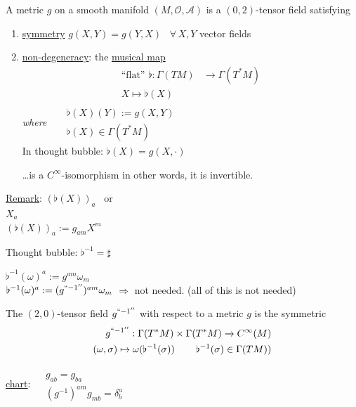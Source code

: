 	\begin{definition}
		A metric $g$ on a smooth manifold $(M,\mathcal{O}, \mathcal{A})$ is a $(0,2)$-tensor field satisfying
		\begin{enumerate}
			\item[(i)] \underline{symmetry} $g(X,Y) = g(Y,X)$ \, $\forall \, X, Y$ vector fields
			\item[(ii)] \underline{non-degeneracy}: the \underline{musical map} 
			\[
			\begin{aligned}
			\text{``flat''} \, \,  \flat : \Gamma(TM) & \to \Gamma(T^*M) \\ 
			X \mapsto \flat(X)
			\end{aligned}
			\]
			\emph{where} \quad \,  $\begin{aligned} & \quad \quad \\ 
			& \flat(X)(Y):= g(X,Y) \\
			& \flat(X) \in \Gamma(T^*M) \end{aligned}$ \\
			In thought bubble: $\flat(X) = g(X,\cdot)$
			
			\dots is a $C^{\infty}$-isomorphism in other words, it is invertible.  
			
			
		\end{enumerate}
	\end{definition}
	
	\underline{Remark}: $(\flat(X))_a$ \quad \, or \\
	$X_a$ \\
	$(\flat(X))_a := g_{am} X^m$
	
	Thought bubble: $\flat^{-1} = \sharp$
	
	$\flat^{-1}(\omega)^a := g^{am}\omega_m$ \\
	$\flat^{-1}(\omega)^a := (g^{``-1''})^{am}\omega_m$
	$\Longrightarrow $ not needed.  (all of this is not needed)
	
	\begin{definition}
		The $(2,0)$-tensor field $g^{``-1''}$ with respect to a metric $g$ is the symmetric
		\[
		\begin{aligned}
		g^{``-1''} : \Gamma(T^*M) \times \Gamma(T^*M) \xrightarrow{ ~ } C^{\infty}(M) \\
		(\omega, \sigma) \mapsto \omega( \flat^{-1}(\sigma)) \quad \quad \, \flat^{-1}(\sigma) \in \Gamma(TM))
		\end{aligned}
		\]
		
		\underline{chart}: $\begin{aligned} & \quad \\ 
		& g_{ab} = g_{ba} \\
		& (g^{-1})^{am} g_{mb} = \delta^a_b \end{aligned}$
		
		
	\end{definition}
	
